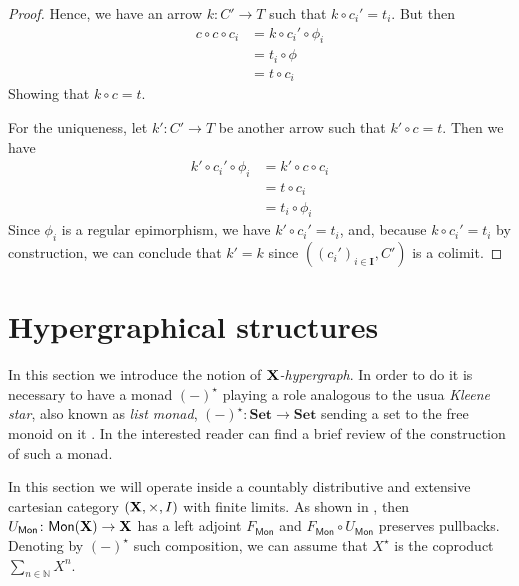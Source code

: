 \documentclass[runningheads,envcountsect]{llncs}
\newcommand{\cat}[1]{\ensuremath{\mathbf{#1}}}
\newcommand{\Set}{\mathbf{Set}}
\def\X{\textbf {\textup{X}}}
\newcommand{\catname}[1]{\textbf{\textup{#1}}}
\newcommand{\mono}[1]{\mathsf{Mon}(\catname{#1})}
\newcommand{\mo}[1]{{#1}_\mathsf{Mon}}
\begin{document}
\begin{proof}
    Hence, we have an arrow $k: C' \to T$ such that $k \circ c_i' = t_i$. But then
    \begin{align*}
        c \circ c \circ c_i &= k \circ c_i' \circ \phi_i \\
                            &= t_i \circ \phi \\
                            &= t \circ c_i
    \end{align*}
    Showing that $k \circ c = t$.

    For the uniqueness, let $k': C' \to T$ be another arrow such that $k' \circ c = t$. Then we have
    \begin{align*}
        k' \circ c_i' \circ \phi_i &= k' \circ c \circ c_i \\
                                   &= t \circ c_i \\
                                   &= t_i \circ \phi_i
    \end{align*}    
    Since $\phi_i$ is a regular epimorphism, we have $k' \circ c_i' = t_i$, and, because $k \circ c_i' = t_i$ by construction, we can conclude that $k'=k$ since $((c_i')_{i \in \cat I}, C')$ is a colimit.
\end{proof}




\section{Hypergraphical structures}\label{sec:hyper}

In this section we introduce the notion of \emph{$\X$-hypergraph}. In order to do it is necessary to have a monad $(-)^\star$ playing a role analogous to the usua \emph{Kleene star}, also known as \emph{list monad}, $(-)^\star\colon \Set\to \Set$ sending a set to the free monoid on it \cite{sakarovitch2009elements,wadler1995monads}. In  the interested reader can find a brief review of the construction of such a monad.


\begin{convention}
	In this section we will operate inside a countably distributive and extensive cartesian category $(\X, \times, I)$ with finite limits. As shown in , then $\mo{U}\colon \mono{\X}\to \X$ has a left adjoint $\mo{F}$ and $\mo{F}\circ \mo{U}$ preserves pullbacks. Denoting by $(-)^\star$ such composition, we can assume that $X^\star$ is the coproduct $\sum_{n\in \mathbb{N}}X^n$.
\end{convention}
\end{document}
